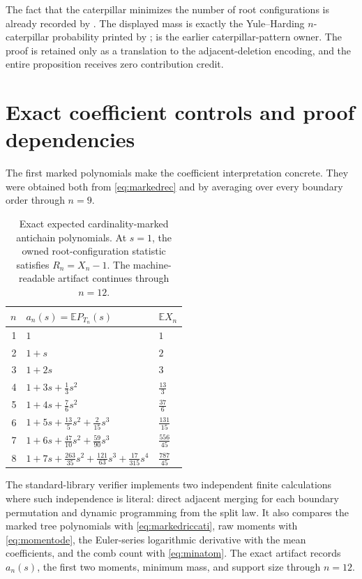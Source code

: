 \documentclass[10pt,a4paper]{amsart}
\theoremstyle{definition}
\theoremstyle{remark}
\newcommand{\E}{\mathbb E}
\begin{document}
The fact that the caterpillar minimizes the number of root configurations is
already recorded by \citet[Section~2.4.4]{DisantoEtAl2022}.  The displayed
mass is exactly the Yule--Harding $n$-caterpillar probability printed by
\citet[Table~1]{ChangFuchs2010}; \citet{Rosenberg2006} is the earlier
caterpillar-pattern owner.  The proof is retained only as a translation to
the adjacent-deletion encoding, and the entire proposition receives zero
contribution credit.

\section{Exact coefficient controls and proof dependencies}

The first marked polynomials make the coefficient interpretation concrete.
They were obtained both from \eqref{eq:markedrec} and by averaging over every
boundary order through $n=9$.

\begin{table}[H]
\centering
\small
\caption{Exact expected cardinality-marked antichain polynomials.  At
$s=1$, the owned root-configuration statistic satisfies $R_n=X_n-1$.
The machine-readable artifact continues through $n=12$.}
\label{tab:marked}
\begin{tabular}{@{}rll@{}}
\toprule
$n$ & $a_n(s)=\E P_{T_n}(s)$ & $\E X_n$ \\
\midrule
1 & $1$ & $1$ \\
2 & $1+s$ & $2$ \\
3 & $1+2s$ & $3$ \\
4 & $1+3s+\frac13s^2$ & $\frac{13}{3}$ \\
5 & $1+4s+\frac76s^2$ & $\frac{37}{6}$ \\
6 & $1+5s+\frac{13}{5}s^2+\frac{2}{15}s^3$ & $\frac{131}{15}$ \\
7 & $1+6s+\frac{47}{10}s^2+\frac{59}{90}s^3$ & $\frac{556}{45}$ \\
8 & $1+7s+\frac{263}{35}s^2+\frac{121}{63}s^3+\frac{17}{315}s^4$
  & $\frac{787}{45}$ \\
\bottomrule
\end{tabular}
\end{table}

The standard-library verifier implements two independent finite
calculations where such independence is literal: direct adjacent merging for
each boundary permutation and dynamic programming from the split law.  It
also compares the marked tree polynomials with \eqref{eq:markedriccati}, raw
moments with \eqref{eq:momentode}, the Euler-series logarithmic derivative
with the mean coefficients, and the comb count with \eqref{eq:minatom}.
The exact artifact
 records $a_n(s)$, the first two
moments, minimum mass, and support size through $n=12$.
\end{document}
